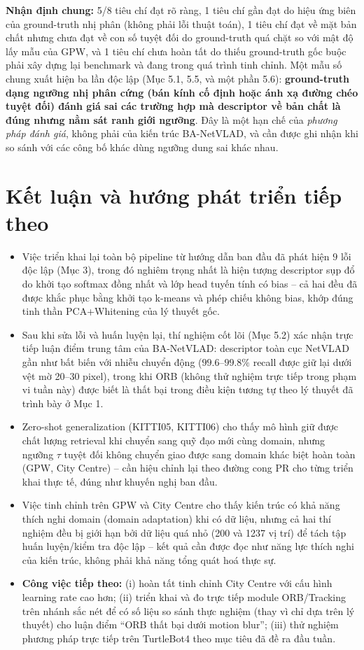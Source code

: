 \documentclass[a4paper,12pt]{article}
\begin{document}
\textbf{Nhận định chung:} 5/8 tiêu chí đạt rõ ràng, 1 tiêu chí gần đạt do hiệu ứng biên của ground-truth nhị phân (không phải lỗi thuật toán), 1 tiêu chí đạt về mặt bản chất nhưng chưa đạt về con số tuyệt đối do ground-truth quá chặt so với mật độ lấy mẫu của GPW, và 1 tiêu chí chưa hoàn tất do thiếu ground-truth gốc buộc phải xây dựng lại benchmark và đang trong quá trình tinh chỉnh. Một mẫu số chung xuất hiện ba lần độc lập (Mục 5.1, 5.5, và một phần 5.6): \textbf{ground-truth dạng ngưỡng nhị phân cứng (bán kính cố định hoặc ánh xạ đường chéo tuyệt đối) đánh giá sai các trường hợp mà descriptor về bản chất là đúng nhưng nằm sát ranh giới ngưỡng}. Đây là một hạn chế của \emph{phương pháp đánh giá}, không phải của kiến trúc BA-NetVLAD, và cần được ghi nhận khi so sánh với các công bố khác dùng ngưỡng dung sai khác nhau.

\section{Kết luận và hướng phát triển tiếp theo}
\begin{itemize}
    \item Việc triển khai lại toàn bộ pipeline từ hướng dẫn ban đầu đã phát hiện $9$ lỗi độc lập (Mục 3), trong đó nghiêm trọng nhất là hiện tượng descriptor sụp đổ do khởi tạo softmax đồng nhất và lớp head tuyến tính có bias -- cả hai đều đã được khắc phục bằng khởi tạo k-means và phép chiếu không bias, khớp đúng tinh thần PCA+Whitening của lý thuyết gốc.
    \item Sau khi sửa lỗi và huấn luyện lại, thí nghiệm cốt lõi (Mục 5.2) xác nhận trực tiếp luận điểm trung tâm của BA-NetVLAD: descriptor toàn cục NetVLAD gần như bất biến với nhiễu chuyển động ($99.6$--$99.8\%$ recall được giữ lại dưới vệt mờ 20--30 pixel), trong khi ORB (không thử nghiệm trực tiếp trong phạm vi tuần này) được biết là thất bại trong điều kiện tương tự theo lý thuyết đã trình bày ở Mục 1.
    \item Zero-shot generalization (KITTI05, KITTI06) cho thấy mô hình giữ được chất lượng retrieval khi chuyển sang quỹ đạo mới cùng domain, nhưng ngưỡng $\tau$ tuyệt đối không chuyển giao được sang domain khác biệt hoàn toàn (GPW, City Centre) -- cần hiệu chỉnh lại theo đường cong PR cho từng triển khai thực tế, đúng như khuyến nghị ban đầu.
    \item Việc tinh chỉnh trên GPW và City Centre cho thấy kiến trúc có khả năng thích nghi domain (domain adaptation) khi có dữ liệu, nhưng cả hai thí nghiệm đều bị giới hạn bởi dữ liệu quá nhỏ (200 và 1237 vị trí) để tách tập huấn luyện/kiểm tra độc lập -- kết quả cần được đọc như năng lực thích nghi của kiến trúc, không phải khả năng tổng quát hoá thực sự.
    \item \textbf{Công việc tiếp theo:} (i) hoàn tất tinh chỉnh City Centre với cấu hình learning rate cao hơn; (ii) triển khai và đo trực tiếp module ORB/Tracking trên nhánh sắc nét để có số liệu so sánh thực nghiệm (thay vì chỉ dựa trên lý thuyết) cho luận điểm ``ORB thất bại dưới motion blur''; (iii) thử nghiệm phương pháp trực tiếp trên TurtleBot4 theo mục tiêu đã đề ra đầu tuần.
\end{itemize}
\end{document}
